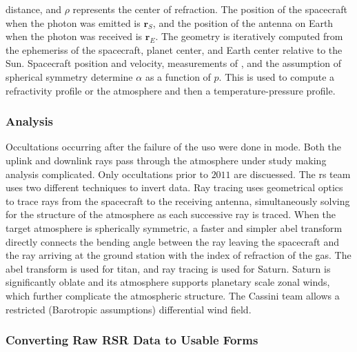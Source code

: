 \documentclass{article}
\theoremstyle{mystyle}
\begin{document}
\noindent distance, and $\rho$ represents the center of refraction. The position of the spacecraft when the photon was emitted is $\mathbf{r}_{S}$, and the position of the antenna on Earth when the photon was received is $\mathbf{r}_{E}$. The geometry is iteratively computed from the \glspl{ephemeris} of the spacecraft, planet center, and Earth center relative to the Sun. Spacecraft position and velocity, measurements of , and the assumption of spherical symmetry determine $\alpha$ as a function of $p$. This is used to compute a refractivity profile or the \gls{atmosphere} and then a \gls{temperature-pressure profile}.

\subsubsection{\footnotesize Analysis}

Occultations occurring after the failure of the \gls{uso} were done in  mode. Both the \gls{uplink} and \gls{downlink} rays pass through the \gls{atmosphere} under study making analysis complicated. Only \glspl{occultation} prior to $2011$ are discuessed. The \gls{rs} team uses two different techniques to invert  data. Ray tracing uses geometrical optics to trace rays from the spacecraft to the receiving antenna, simultaneously solving for the structure of the \gls{atmosphere} as each successive ray is traced. When the target \gls{atmosphere} is spherically symmetric, a faster and simpler \gls{abel transform} directly connects the \gls{bending angle} between the ray leaving the spacecraft and the ray arriving at the ground station with the index of refraction of the gas. The \gls{abel transform} is used for \gls{titan}, and ray tracing is used for Saturn. Saturn is significantly oblate and its atmosphere supports planetary scale zonal winds, which further complicate the atmospheric structure. The Cassini team allows a restricted (Barotropic assumptions) differential wind field.

\subsubsection{\footnotesize Converting Raw RSR Data to Usable Forms}
\end{document}

